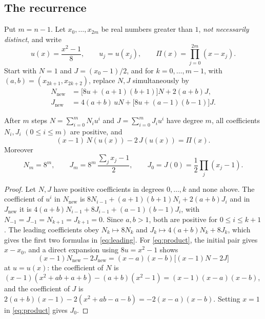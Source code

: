 \subsection{The recurrence}
Put \(m=n-1\). Let \(x_0,\dots,x_{2m}\) be real numbers greater than \(1\), \emph{not
necessarily distinct}, and write
\begin{equation}\label{eq:ux}
 u(x)=\frac{x^2-1}{8},\qquad u_j=u(x_j),\qquad \Pi(x)=\prod_{j=0}^{2m}(x-x_j).
\end{equation}
Start with \(N=1\) and \(J=(x_0-1)/2\), and for \(k=0,\dots,m-1\), with
\((a,b)=(x_{2k+1},x_{2k+2})\), replace \(N,J\) simultaneously by
\begin{equation}\label{eq:recurrence}
\begin{aligned}
 N_{\mathrm{new}}&=\bigl[8u+(a+1)(b+1)\bigr]N+2(a+b)J,\\
 J_{\mathrm{new}}&=4(a+b)\,uN+\bigl[8u+(a-1)(b-1)\bigr]J .
\end{aligned}
\end{equation}

\begin{lemma}\label{lem:recurrence}
After \(m\) steps \(N=\sum_{i=0}^m N_iu^i\) and \(J=\sum_{i=0}^m J_iu^i\) have degree \(m\),
all coefficients \(N_i,J_i\) \((0\le i\le m)\) are positive, and
\begin{equation}\label{eq:product}
 (x-1)\,N(u(x))-2\,J(u(x))=\Pi(x).
\end{equation}
Moreover
\begin{equation}\label{eq:leading}
 N_m=8^m,\qquad J_m=8^m\,\frac{\sum_jx_j-1}{2},\qquad J_0=J(0)=\frac12\prod_{j}(x_j-1).
\end{equation}
\end{lemma}
\begin{proof}
Let \(N,J\) have positive coefficients in degrees \(0,\dots,k\) and none above. The
coefficient of \(u^i\) in \(N_{\mathrm{new}}\) is \(8N_{i-1}+(a+1)(b+1)N_i+2(a+b)J_i\) and in
\(J_{\mathrm{new}}\) it is \(4(a+b)N_{i-1}+8J_{i-1}+(a-1)(b-1)J_i\), with
\(N_{-1}=J_{-1}=N_{k+1}=J_{k+1}=0\). Since \(a,b>1\), both are positive for \(0\le i\le k+1\).
The leading coefficients obey \(N_k\mapsto8N_k\) and \(J_k\mapsto4(a+b)N_k+8J_k\), which gives
the first two formulas in \eqref{eq:leading}. For \eqref{eq:product}, the initial pair gives
\(x-x_0\), and a direct expansion using \(8u=x^2-1\) shows
\[
 (x-1)N_{\mathrm{new}}-2J_{\mathrm{new}}
 =(x-a)(x-b)\bigl[(x-1)N-2J\bigr]
\]
at \(u=u(x)\): the coefficient of \(N\) is
\((x-1)(x^2+ab+a+b)-(a+b)(x^2-1)=(x-1)(x-a)(x-b)\), and the coefficient of \(J\) is
\(2(a+b)(x-1)-2(x^2+ab-a-b)=-2(x-a)(x-b)\). Setting \(x=1\) in \eqref{eq:product} gives \(J_0\).
\end{proof}

